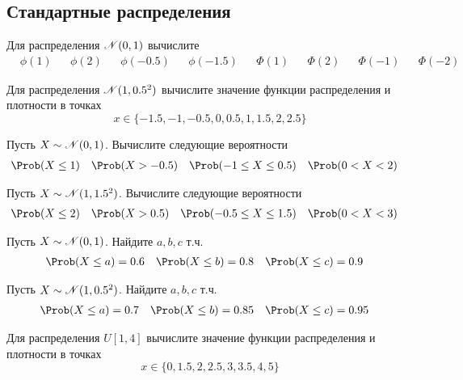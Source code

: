 \subsection{Стандартные распределения}

\begin{exercise}
Для распределения \({\mathscr N}(0,1)\) вычислите
\begin{align*}
	&\phi(1) & &\phi(2) & &\phi(-0.5) & &\phi(-1.5) & &\Phi(1) & &\Phi(2) & &\Phi(-1) & &\Phi(-2)
\end{align*}
\end{exercise}

\begin{exercise}
Для распределения \({\mathscr N}(1,0.5^2)\) вычислите значение функции распределения и плотности в точках
\[
	x\in\{-1.5, -1, -0.5, 0, 0.5, 1, 1.5, 2, 2.5\}
\]
\end{exercise}

\begin{exercise}
Пусть \(X\sim{\mathscr N}(0,1)\). Вычислите следующие вероятности
\begin{align*}
	&\Prob(X\leq1) & &\Prob(X>-0.5) & 
	&\Prob(-1\leq X\leq0.5) & &\Prob(0<X<2)
\end{align*}
\end{exercise}

\begin{exercise}
Пусть \(X\sim{\mathscr N}(1,1.5^2)\). Вычислите следующие вероятности
\begin{align*}
	&\Prob(X\leq2) & &\Prob(X>0.5) & 
	&\Prob(-0.5\leq X\leq1.5) & &\Prob(0<X<3)
\end{align*}
\end{exercise}

\begin{exercise}
Пусть \(X\sim{\mathscr N}(0,1)\). Найдите \(a,b,c\) т.ч.
\begin{align*}
	&\Prob(X\leq a)=0.6 & &\Prob(X\leq b)=0.8 & 
	&\Prob(X\leq c)=0.9
\end{align*}
\end{exercise}

\begin{exercise}
Пусть \(X\sim{\mathscr N}(1,0.5^2)\). Найдите \(a,b,c\) т.ч.
\begin{align*}
	&\Prob(X\leq a)=0.7 & &\Prob(X\leq b)=0.85 & 
	&\Prob(X\leq c)=0.95
\end{align*}
\end{exercise}

\begin{exercise}
Для распределения \(U[1, 4]\) 
вычислите значение функции распределения и плотности в точках
\[
	x\in\{0, 1.5, 2, 2.5, 3, 3.5, 4, 5\}
\]
\end{exercise}

